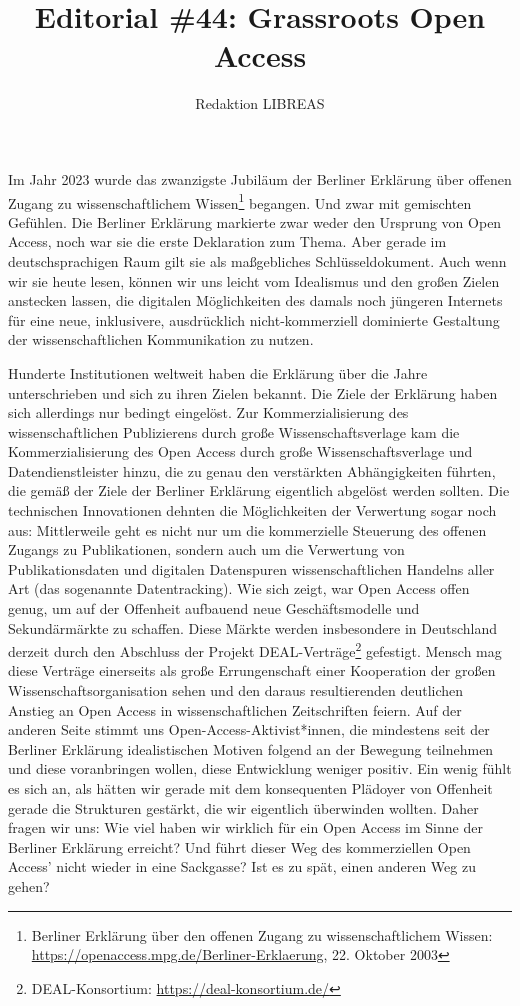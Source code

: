 \documentclass[a4paper,
fontsize=11pt,
oneside,
numbers=noperiodatend,
parskip=half-,
bibliography=totoc,
final
]{scrartcl}
\title{\LARGE{Editorial \#44: Grassroots Open Access}}%
\author{Redaktion LIBREAS} %
\date{}
\begin{document}
\maketitle
\thispagestyle{fancyplain} 


Im Jahr 2023 wurde das zwanzigste Jubiläum der Berliner Erklärung über
offenen Zugang zu wissenschaftlichem Wissen\footnote{Berliner Erklärung
  über den offenen Zugang zu wissenschaftlichem Wissen:
  \url{https://openaccess.mpg.de/Berliner-Erklaerung}, 22. Oktober 2003}
begangen. Und zwar mit gemischten Gefühlen. Die Berliner Erklärung
markierte zwar weder den Ursprung von Open Access, noch war sie die
erste Deklaration zum Thema. Aber gerade im deutschsprachigen Raum gilt
sie als maßgebliches Schlüsseldokument. Auch wenn wir sie heute lesen,
können wir uns leicht vom Idealismus und den großen Zielen anstecken
lassen, die digitalen Möglichkeiten des damals noch jüngeren Internets
für eine neue, inklusivere, ausdrücklich nicht-kommerziell dominierte
Gestaltung der wissenschaftlichen Kommunikation zu nutzen.

Hunderte Institutionen weltweit haben die Erklärung über die Jahre
unterschrieben und sich zu ihren Zielen bekannt. Die Ziele der Erklärung
haben sich allerdings nur bedingt eingelöst. Zur Kommerzialisierung des
wissenschaftlichen Publizierens durch große Wissenschaftsverlage kam die
Kommerzialisierung des Open Access durch große Wissenschaftsverlage und
Datendienstleister hinzu, die zu genau den verstärkten Abhängigkeiten
führten, die gemäß der Ziele der Berliner Erklärung eigentlich abgelöst
werden sollten. Die technischen Innovationen dehnten die Möglichkeiten
der Verwertung sogar noch aus: Mittlerweile geht es nicht nur um die
kommerzielle Steuerung des offenen Zugangs zu Publikationen, sondern
auch um die Verwertung von Publikationsdaten und digitalen Datenspuren
wissenschaftlichen Handelns aller Art (das sogenannte Datentracking).
Wie sich zeigt, war Open Access offen genug, um auf der Offenheit
aufbauend neue Geschäftsmodelle und Sekundärmärkte zu schaffen. Diese
Märkte werden insbesondere in Deutschland derzeit durch den Abschluss
der Projekt DEAL-Verträge\footnote{DEAL-Konsortium:
  \url{https://deal-konsortium.de/}} gefestigt. Mensch mag diese
Verträge einerseits als große Errungenschaft einer Kooperation der
großen Wissenschaftsorganisation sehen und den daraus resultierenden
deutlichen Anstieg an Open Access in wissenschaftlichen Zeitschriften
feiern. Auf der anderen Seite stimmt uns Open-Access-Aktivist*innen, die
mindestens seit der Berliner Erklärung idealistischen Motiven folgend an
der Bewegung teilnehmen und diese voranbringen wollen, diese Entwicklung
weniger positiv. Ein wenig fühlt es sich an, als hätten wir gerade mit
dem konsequenten Plädoyer von Offenheit gerade die Strukturen gestärkt,
die wir eigentlich überwinden wollten. Daher fragen wir uns: Wie viel
haben wir wirklich für ein Open Access im Sinne der Berliner Erklärung
erreicht? Und führt dieser Weg des kommerziellen Open Access' nicht
wieder in eine Sackgasse? Ist es zu spät, einen anderen Weg zu gehen?
\end{document}
